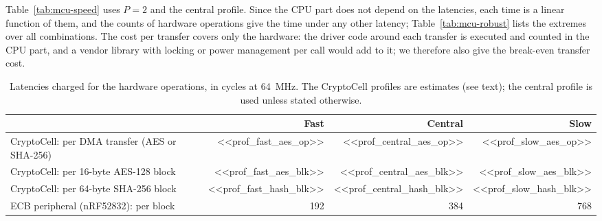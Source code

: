 Table~\ref{tab:mcu-speed} uses $P = 2$ and the central profile. Since the
CPU part does not depend on the latencies, each time is a linear function of
them, and the counts of hardware operations give the time under any other
latency; Table~\ref{tab:mcu-robust} lists the extremes over all combinations.
The cost per transfer covers only the hardware: the driver code around
each transfer is executed and counted in the CPU part, and a vendor library
with locking or power management per call would add to it; we therefore also
give the break-even transfer cost.

\begin{table}[!hbt]
\caption{Latencies charged for the hardware operations, in cycles at 64~MHz.
The CryptoCell profiles are estimates (see text); the central profile is
used unless stated otherwise.}
\label{tab:mcu-latency}
\centering
\small
\renewcommand{\arraystretch}{1.25}
\begin{tabular}{lrrr}
\hline
 & Fast & Central & Slow \\
\hline\hline
CryptoCell: per DMA transfer (AES or SHA-256) & <<prof_fast_aes_op>> & <<prof_central_aes_op>> & <<prof_slow_aes_op>> \\
CryptoCell: per 16-byte AES-128 block & <<prof_fast_aes_blk>> & <<prof_central_aes_blk>> & <<prof_slow_aes_blk>> \\
CryptoCell: per 64-byte SHA-256 block & <<prof_fast_hash_blk>> & <<prof_central_hash_blk>> & <<prof_slow_hash_blk>> \\
\hline
ECB peripheral (nRF52832): per block & 192 & 384 & 768 \\
\hline
\end{tabular}
\end{table}


